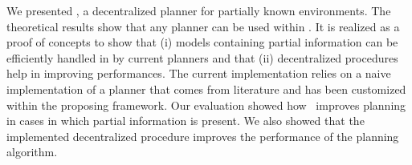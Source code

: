 We presented  \toolName, a  decentralized planner for partially known environments.
The theoretical results show that any planner can be used within \toolName. %
It is realized as a proof of concepts to show that (i) models containing partial information can be efficiently handled in by current planners and that (ii) decentralized procedures help in improving performances.
The current implementation relies on a naive implementation of a planner that comes from literature and has been customized within the proposing framework.
Our evaluation showed how  \toolName\ improves planning in cases in which partial information is present.
We also showed that the implemented decentralized procedure improves the performance of the planning algorithm.
